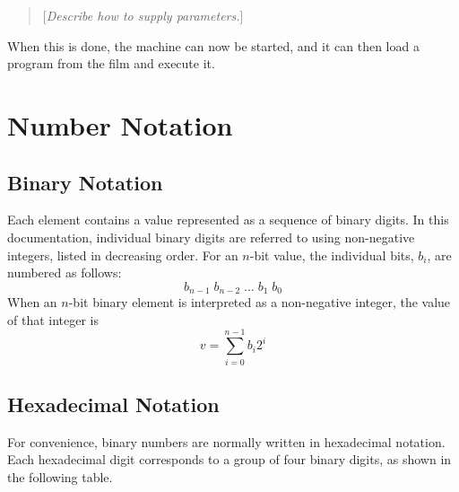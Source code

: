 \documentclass[a4paper,12pt]{article}
\newcommand{\comment}[1]{\begin{quote}[\textit{#1}]\end{quote}}
\begin{document}
\comment{Describe how to supply parameters.}

When this is done, the machine can now be started, and it can then load a program from the film and execute it.

\appendix


\section{Number Notation}
\label{sec:number-notation}

\subsection{Binary Notation}
\label{sec:binary-notation}

Each element contains a value represented as a sequence of binary digits.
In this documentation, individual binary digits are referred to using non-negative integers, listed in decreasing order.
For an $n$-bit value, the individual bits, $b_i$, are numbered as follows:
\[ b_{n-1} \; b_{n-2} \; \ldots \; b_{1} \; b_{0} \]
When an $n$-bit binary element is interpreted as a non-negative integer, the value of that integer is
\[
    v = \sum_{i=0}^{n-1} b_{i}2^{i}
\]

\subsection{Hexadecimal Notation}
\label{sec:hexadecimal-notation}

For convenience, binary numbers are normally written in hexadecimal notation.
Each hexadecimal digit corresponds to a group of four binary digits, as shown in the following table.
\end{document}
